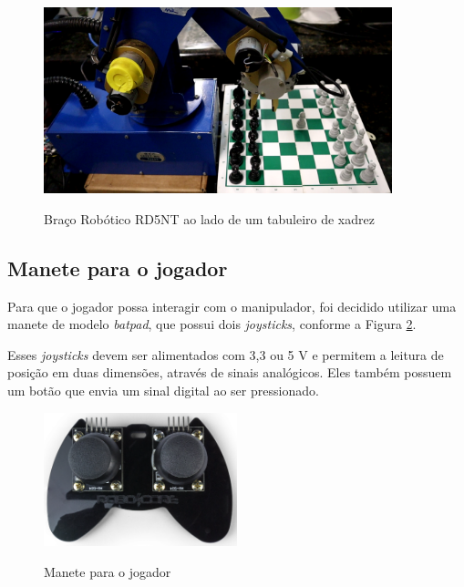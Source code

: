 \begin{figure}[H]
    \centering
    \caption{Braço Robótico RD5NT ao lado de um tabuleiro de xadrez}
    \includegraphics[keepaspectratio=true, width=0.9\textwidth]
    	{img/braco-tabuleiro.png}
    \label{fig:fotoBracoTabuleiro}
\end{figure}

\subsection[Manete para o jogador]{Manete para o jogador}
\label{sub:maneteJogador}

Para que o jogador possa interagir com o manipulador, foi decidido utilizar uma manete de modelo \textit{batpad}, que possui dois \textit{joysticks}, conforme a Figura \ref{fig:fotoManeteJogador}.

Esses \textit{joysticks} devem ser alimentados com 3,3 ou 5 V e permitem a leitura de posição em duas dimensões, através de sinais analógicos.
Eles também possuem um botão que envia um sinal digital ao ser pressionado.

\begin{figure}[H]
    \centering
    \caption{Manete para o jogador}
    \includegraphics[keepaspectratio=true, width=0.5\textwidth]
    	{img/foto-controle-jogadores.png}
    \label{fig:fotoManeteJogador}
\end{figure}

